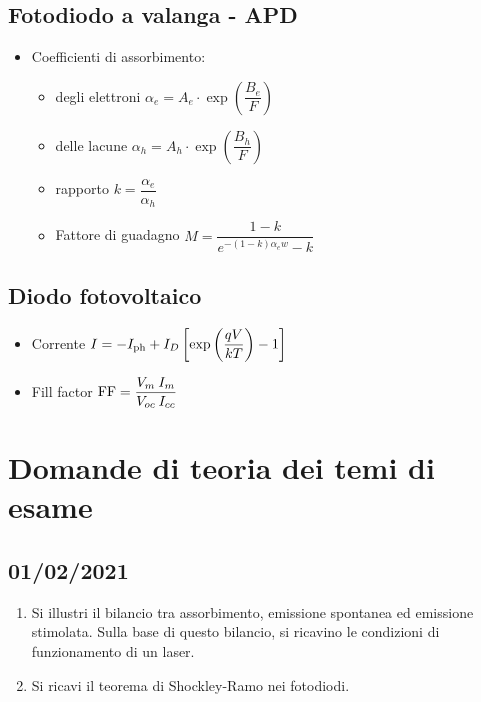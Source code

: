 \documentclass{article}
\begin{document}
\subsection{Fotodiodo a valanga - APD}
\begin{itemize}
  \item Coefficienti di assorbimento:
        \begin{itemize}
          \item degli elettroni \( \alpha_e = A_e \cdot \exp\left(\dfrac{B_e}{F}\right) \)
          \item delle lacune \( \alpha_h = A_h \cdot \exp\left(\dfrac{B_h}{F}\right) \)
          \item rapporto \( k = \dfrac{\alpha_e}{\alpha_h} \)
          \item Fattore di guadagno \( M = \dfrac{1 - k}{e^{-(1-k) \alpha_e w} - k } \)
        \end{itemize}
\end{itemize}

\subsection{Diodo fotovoltaico}
\begin{itemize}
  \item Corrente \( I = - I_{\textnormal{ph}} + I_D \left[\exp\left(\dfrac{qV}{kT}\right) - 1 \right] \)
  \item Fill factor \( \textnormal{FF} = \dfrac{V_m \: I_m}{V_{oc} \: I_{cc}} \)
\end{itemize}

\newpage

\section{Domande di teoria dei temi di esame}

\subsection{01/02/2021}
\begin{enumerate}
  \item Si illustri il bilancio tra assorbimento, emissione spontanea ed emissione stimolata. Sulla base di questo bilancio,
        si ricavino le condizioni di funzionamento di un laser.
  \item Si ricavi il teorema di Shockley-Ramo nei fotodiodi.
\end{enumerate}
\end{document}
